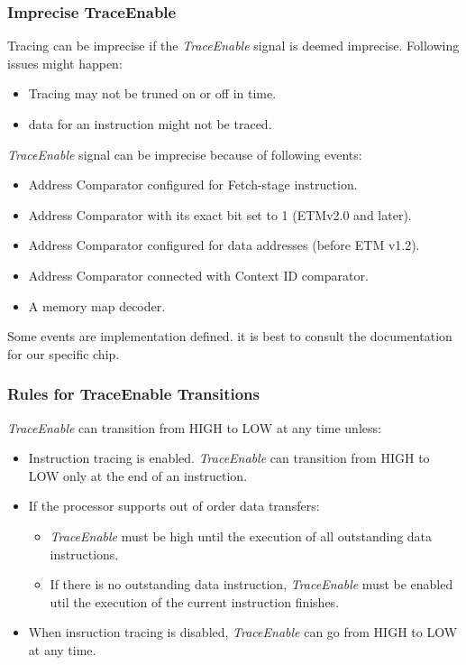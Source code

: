 \documentclass{beamer}
\begin{document}
\begin{frame}
    \frametitle{Imprecise TraceEnable}
    Tracing can be imprecise if the \textit{TraceEnable} signal is deemed
    imprecise. Following issues might happen:
    \begin{itemize}
        \item Tracing may not be truned on or off in time.
        \item data for an instruction might not be traced.
    \end{itemize}
    \textit{TraceEnable} signal can be imprecise because of following events:
    \begin{itemize}
        \item Address Comparator configured for Fetch-stage instruction.
        \item Address Comparator with its exact bit set to 1
            (ETMv2.0 and later).
        \item Address Comparator configured for data addresses
            (before ETM v1.2).
        \item Address Comparator connected with Context ID comparator.
        \item A memory map decoder.
    \end{itemize}
    Some events are implementation defined. it is best to consult the
    documentation for our specific chip.
\end{frame}

\begin{frame}
    \frametitle{Rules for TraceEnable Transitions}
    \textit{TraceEnable} can transition from HIGH to LOW at any time unless:
    \begin{itemize}
        \item Instruction tracing is enabled. \textit{TraceEnable} can
            transition from HIGH to LOW only at the end of an instruction.
        \item If the processor supports out of order data transfers:
            \begin{itemize}
                \item \textit{TraceEnable} must be high until the execution of
                    all outstanding data instructions.
                \item If there is no outstanding data instruction,
                    \textit{TraceEnable} must be enabled util
                    the execution of the current instruction finishes.
            \end{itemize}
        \item When insruction tracing is disabled, \textit{TraceEnable} can go
            from HIGH to LOW at any time.
    \end{itemize}
\end{frame}
\end{document}
